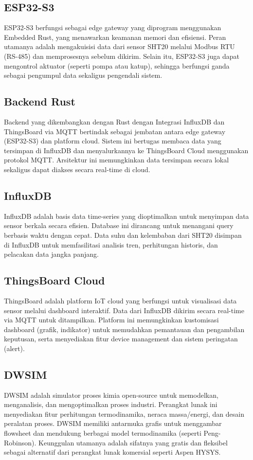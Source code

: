 \documentclass[a4paper, 12pt]{article}
\begin{document}
\subsection{ESP32-S3}
ESP32-S3 berfungsi sebagai edge gateway yang diprogram menggunakan Embedded Rust, yang menawarkan keamanan memori dan efisiensi. Peran utamanya adalah mengakuisisi data dari sensor SHT20 melalui Modbus RTU (RS-485) dan memprosesnya sebelum dikirim. Selain itu, ESP32-S3 juga dapat mengontrol aktuator (seperti pompa atau katup), sehingga berfungsi ganda sebagai pengumpul data sekaligus pengendali sistem.

\subsection{Backend Rust}
Backend yang dikembangkan dengan Rust dengan Integrasi InfluxDB dan ThingsBoard via MQTT bertindak sebagai jembatan antara edge gateway (ESP32-S3) dan platform cloud. Sistem ini bertugas membaca data yang tersimpan di InfluxDB dan menyalurkannya ke ThingsBoard Cloud menggunakan protokol MQTT. Arsitektur ini memungkinkan data tersimpan secara lokal sekaligus dapat diakses secara real-time di cloud.

\subsection{InfluxDB}
InfluxDB adalah basis data time-series yang dioptimalkan untuk menyimpan data sensor berkala secara efisien. Database ini dirancang untuk menangani query berbasis waktu dengan cepat. Data suhu dan kelembaban dari SHT20 disimpan di InfluxDB untuk memfasilitasi analisis tren, perhitungan historis, dan pelacakan data jangka panjang.

\subsection{ThingsBoard Cloud}
ThingsBoard adalah platform IoT cloud yang berfungsi untuk visualisasi data sensor melalui dashboard interaktif. Data dari InfluxDB dikirim secara real-time via MQTT untuk ditampilkan. Platform ini memungkinkan kustomisasi dashboard (grafik, indikator) untuk memudahkan pemantauan dan pengambilan keputusan, serta menyediakan fitur device management dan sistem peringatan (alert).

\subsection{DWSIM}
DWSIM adalah simulator proses kimia open-source untuk memodelkan, menganalisis, dan mengoptimalkan proses industri. Perangkat lunak ini menyediakan fitur perhitungan termodinamika, neraca massa/energi, dan desain peralatan proses. DWSIM memiliki antarmuka grafis untuk menggambar flowsheet dan mendukung berbagai model termodinamika (seperti Peng-Robinson). Keunggulan utamanya adalah sifatnya yang gratis dan fleksibel sebagai alternatif dari perangkat lunak komersial seperti Aspen HYSYS.
\newpage
\end{document}
